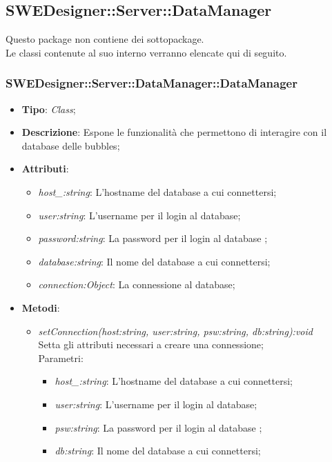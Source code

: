 \documentclass[../DefinizioneDiProdotto.tex]{subfiles}
\begin{document}
			
			\subsection{SWEDesigner::Server::DataManager}
			Questo package non contiene dei sottopackage.\\
			Le classi contenute al suo interno verranno elencate qui di seguito.
			\subsubsection{SWEDesigner::Server::DataManager::DataManager}
			\hypertarget{SWEDesigner::Server::DataManager::DataManager}{}
			\begin{itemize}
				\item \textbf{Tipo}: \emph{Class};
				\item \textbf{Descrizione}: Espone le funzionalità che permettono di interagire con il database delle bubbles; \\
				\item \textbf{Attributi}:
				\begin{itemize}
					\item \emph{host\_:string}: L'hostname del database a cui connettersi;
					\item \emph{user:string}: L'username per il login al database;
					\item \emph{password:string}: La password per il login al database ;
					\item \emph{database:string}: Il nome del database a cui connettersi;
					\item \emph{connection:Object}: La connessione al database;
				\end{itemize}
				\item \textbf{Metodi}:
				\begin{itemize}
					\item \emph{setConnection(host:string, user:string, psw:string, db:string):void} \\ 
					Setta gli attributi necessari a creare una connessione; \\
					Parametri:
					\begin{itemize}
						\item \emph{host\_:string}: L'hostname del database a cui connettersi;
						\item \emph{user:string}: L'username per il login al database;
						\item \emph{psw:string}: La password per il login al database ;
						\item \emph{db:string}: Il nome del database a cui connettersi;
					\end{itemize}
					

\end{itemize}
\end{itemize}
\end{document}
